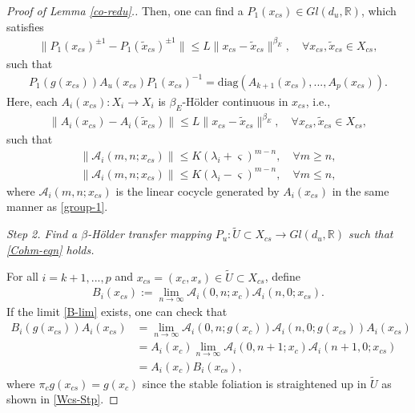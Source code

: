 \documentclass[reqno]{amsart}
\numberwithin{equation}{section}
\begin{document}
\begin{proof}[Proof of Lemma {\rm \ref{co-redu}}.]
Then, one can find a $P_1(x_{cs})\in Gl(d_u,\mathbb{R})$, which satisfies
\begin{align}\label{EP-1}
  \|P_1(x_{cs})^{\pm 1}- P_1(\tilde{x}_{cs})^{\pm 1}\| \le L\|x_{cs}-\tilde{x}_{cs}\|^{\beta_E},\quad \forall x_{cs},\tilde x_{cs}\in X_{cs},
\end{align}
such that
\begin{align}\label{PP-cs}
P_1(g(x_{cs})) A_u(x_{cs}) P_1(x_{cs})^{-1}=\mathrm{diag}(A_{k+1}(x_{cs}),...,A_{p}(x_{cs})).
\end{align}
Here, each $A_i(x_{cs}):X_i\to X_i$ is $\beta_E$-H\"{o}lder continuous in $x_{cs}$, i.e.,
\begin{align}\label{AA-u}
  \|A_i(x_{cs})- A_i(\tilde{x}_{cs})\| \le L\|x_{cs}-\tilde{x}_{cs}\|^{\beta_E},\quad \forall x_{cs},\tilde x_{cs}\in X_{cs},
\end{align}
such that
\begin{equation}\label{k-dich}
\begin{split}
\|\mathcal{A}_i(m,n;x_{cs})\| \le K (\lambda_i + \varsigma)^{m-n}, \quad \forall m\ge n,
\\
\|\mathcal{A}_i(m,n;x_{cs})\| \le K (\lambda_i -\varsigma)^{m-n}, \quad \forall m\le n,
\end{split}
\end{equation}
where $\mathcal{A}_i(m,n;x_{cs})$ is the linear cocycle generated by $A_i(x_{cs})$ in the same manner as \eqref{group-1}.




{\em Step 2.
Find a $\beta$-H\"older transfer mapping $P_u:\tilde U\subset X_{cs}\to Gl(d_u,\mathbb{R})$ such that \eqref{Cohm-eqn} holds.}

For all $i=k+1,...,p$ and $x_{cs}=(x_c,x_s)\in \tilde U\subset X_{cs}$, define
\begin{align}\label{B-lim}
B_i(x_{cs}):= \lim_{n\to \infty} \mathcal{A}_i(0,n;x_c) \mathcal{A}_i(n,0;x_{cs}).
\end{align}
If the limit \eqref{B-lim} exists, one can check that
\begin{align}\label{B-conju}
B_i (g(x_{cs})) A_i (x_{cs})
&=\lim_{n\to \infty} \mathcal{A}_i(0,n;g(x_c)) \mathcal{A}_i(n,0;g(x_{cs}))A_i (x_{cs})
\nonumber\\
&=A_i(x_c)\lim_{n\to \infty} \mathcal{A}_i(0,n+1;x_c) \mathcal{A}_i(n+1,0;x_{cs})
\nonumber\\
&=A_i(x_c) B_i(x_{cs}),
\end{align}
where $\pi_c g(x_{cs})=g(x_c)$ since the stable foliation is straightened up in $\tilde U$ as shown in \eqref{Wcs-Stp}.


\end{proof}
\end{document}

